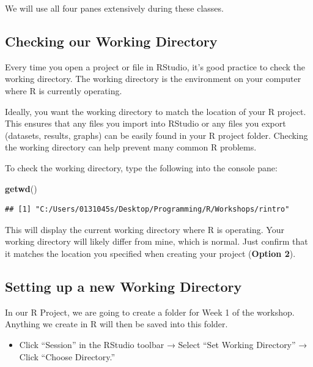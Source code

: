 \documentclass[
]{book}
\newenvironment{Shaded}{\begin{snugshade}}{\end{snugshade}}
\newcommand{\FunctionTok}[1]{\textcolor[rgb]{0.13,0.29,0.53}{\textbf{#1}}}
\newcommand{\NormalTok}[1]{#1}
\providecommand{\tightlist}{%
  \setlength{\itemsep}{0pt}\setlength{\parskip}{0pt}}
\begin{document}
We will use all four panes extensively during these classes.

\subsection{Checking our Working Directory}\label{checking-our-working-directory}

Every time you open a project or file in RStudio, it's good practice to check the working directory. The working directory is the environment on your computer where R is currently operating.

Ideally, you want the working directory to match the location of your R project. This ensures that any files you import into RStudio or any files you export (datasets, results, graphs) can be easily found in your R project folder. Checking the working directory can help prevent many common R problems.

To check the working directory, type the following into the console pane:

\begin{Shaded}
\begin{Highlighting}[]
\FunctionTok{getwd}\NormalTok{()}
\end{Highlighting}
\end{Shaded}

\begin{verbatim}
## [1] "C:/Users/0131045s/Desktop/Programming/R/Workshops/rintro"
\end{verbatim}

This will display the current working directory where R is operating. Your working directory will likely differ from mine, which is normal. Just confirm that it matches the location you specified when creating your project (\textbf{Option 2}).

\subsection{Setting up a new Working Directory}\label{set_wd}

In our R Project, we are going to create a folder for Week 1 of the workshop. Anything we create in R will then be saved into this folder.

\begin{itemize}
\tightlist
\item
  Click ``Session'' in the RStudio toolbar → Select ``Set Working Directory'' → Click ``Choose Directory.''
\end{itemize}
\end{document}
